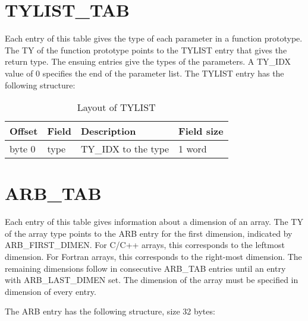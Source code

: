 \section{TYLIST\_TAB}

Each entry of this table gives the type of each parameter in a
function prototype. The
%
TY of the function prototype points to the
%
TYLIST entry that gives the return type. The ensuing entries give the
types of the parameters. A
%
TY\_IDX value of 0 specifies the end of the
parameter list. The
%
TYLIST entry has the following structure:

\begin{table}[h]
\centering
\caption{Layout of TYLIST}
\label{Table_23} 
\begin{tabular}{|l|l|l|l|}\hline
Offset & Field & Description & Field size\\\hline\hline 
byte 0 & type &
\index{TY\_IDX}%
TY\_IDX to the type & 1 word\\\hline
\end{tabular}
\end{table}


\section{ARB\_TAB}

Each entry of this table gives information about a dimension of an
array. The
%
TY of the array type points to the
%
ARB entry for the first
dimension, indicated by ARB\_FIRST\_DIMEN. For C/C++ arrays, this
corresponds to the leftmost dimension. For Fortran arrays, this
corresponds to the right-most dimension. The remaining dimensions
follow in consecutive
%
ARB\_TAB entries until an entry with
%
ARB\_LAST\_DIMEN set. The dimension of the array must be specified in
dimension of every entry.

The
%
ARB entry has the following structure, size 32 bytes:

